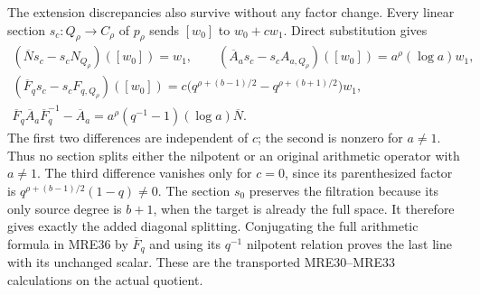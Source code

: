 The extension discrepancies also survive without any factor change.
Every linear section \(s_c:Q_\rho\to C_\rho\) of \(p_\rho\)
sends \([w_0]\) to \(w_0+cw_1\). Direct substitution gives
\[
 \begin{gathered}
 (\overline Ns_c-s_cN_{Q_\rho})([w_0])=w_1,\qquad
 (\overline A_as_c-s_cA_{a,Q_\rho})([w_0])
                                       =a^\rho(\log a)w_1,\\
 (\overline F_qs_c-s_cF_{q,Q_\rho})([w_0])
        =c\bigl(q^{\rho+(b-1)/2}-q^{\rho+(b+1)/2}\bigr)w_1,\\
 \overline F_q\overline A_a\overline F_q^{-1}
                  -\overline A_a
           =a^\rho(q^{-1}-1)(\log a)\overline N.
 \end{gathered}
 \tag{MRE41}
\]
The first two differences are independent of \(c\); the second
is nonzero for \(a\ne1\). Thus no section splits either the
nilpotent or an original arithmetic operator with \(a\ne1\).
The third difference vanishes only for \(c=0\), since its
parenthesized factor is
\(q^{\rho+(b-1)/2}(1-q)\ne0\). The section \(s_0\) preserves
the filtration because its only source degree is \(b+1\), when
the target is already the full space. It therefore gives exactly
the added diagonal splitting. Conjugating the full arithmetic
formula in MRE36 by \(\overline F_q\) and using its
\(q^{-1}\) nilpotent relation proves the last line with its
unchanged scalar. These are the transported MRE30--MRE33
calculations on the actual quotient.


